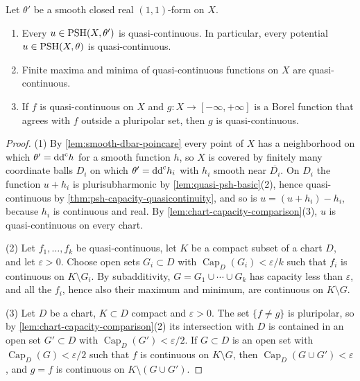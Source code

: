 \begin{lemma}\label{lem:global-quasi-continuity}
Let $\theta'$ be a smooth closed real $(1,1)$-form on $X$.
\begin{enumerate}
 \item Every $u\in\mathrm{PSH}(X,\theta')$ is quasi-continuous. In particular, every potential $u\in\mathrm{PSH}(X,\theta)$ is quasi-continuous.
 \item Finite maxima and minima of quasi-continuous functions on $X$ are quasi-continuous.
 \item If $f$ is quasi-continuous on $X$ and $g\colon X\to[-\infty,+\infty]$ is a Borel function that agrees with $f$ outside a pluripolar set, then $g$ is quasi-continuous.
\end{enumerate}
\end{lemma}
\begin{proof}
(1) By \cref{lem:smooth-dbar-poincare} every point of $X$ has a neighborhood on which $\theta'=\mathrm{dd}^{\mathrm{c}} h$ for a smooth function $h$, so $X$ is covered by finitely many coordinate balls $D_i$ on which $\theta'=\mathrm{dd}^{\mathrm{c}} h_i$ with $h_i$ smooth near $\overline{D_i}$. On $D_i$ the function $u+h_i$ is plurisubharmonic by \cref{lem:quasi-psh-basic}(2), hence quasi-continuous by \cref{thm:psh-capacity-quasicontinuity}, and so is $u=(u+h_i)-h_i$, because $h_i$ is continuous and real. By \cref{lem:chart-capacity-comparison}(3), $u$ is quasi-continuous on every chart.

(2) Let $f_1,\ldots,f_k$ be quasi-continuous, let $K$ be a compact subset of a chart $D$, and let $\varepsilon>0$. Choose open sets $G_i\subset D$ with $\operatorname{Cap}_D(G_i)<\varepsilon/k$ such that $f_i$ is continuous on $K\setminus G_i$. By subadditivity, $G=G_1\cup\cdots\cup G_k$ has capacity less than $\varepsilon$, and all the $f_i$, hence also their maximum and minimum, are continuous on $K\setminus G$.

(3) Let $D$ be a chart, $K\subset D$ compact and $\varepsilon>0$. The set $\{f\ne g\}$ is pluripolar, so by \cref{lem:chart-capacity-comparison}(2) its intersection with $D$ is contained in an open set $G'\subset D$ with $\operatorname{Cap}_D(G')<\varepsilon/2$. If $G\subset D$ is an open set with $\operatorname{Cap}_D(G)<\varepsilon/2$ such that $f$ is continuous on $K\setminus G$, then $\operatorname{Cap}_D(G\cup G')<\varepsilon$, and $g=f$ is continuous on $K\setminus(G\cup G')$.
\end{proof}


